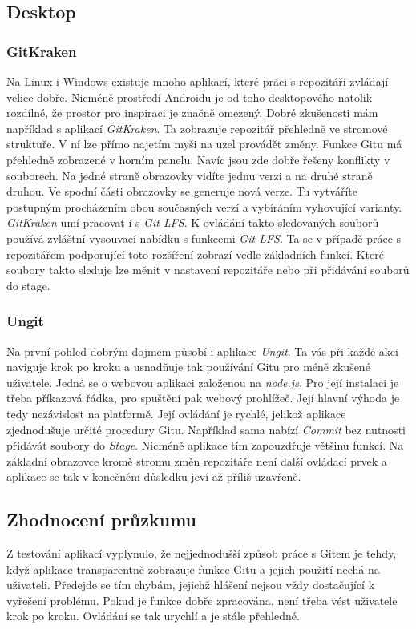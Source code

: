     \subsection {Desktop}
    \subsubsection{GitKraken}
    Na Linux i Windows existuje mnoho aplikací, které práci s repozitáři zvládají velice dobře. Nicméně prostředí Androidu je od toho desktopového natolik rozdílné, že prostor pro inspiraci je značně omezený. Dobré zkušenosti mám například s aplikací \emph{GitKraken}. Ta zobrazuje repozitář přehledně ve stromové struktuře. V ní lze přímo najetím myši na uzel provádět změny. Funkce Gitu má přehledně zobrazené v horním panelu. Navíc jsou zde dobře řešeny konflikty v souborech. Na jedné straně obrazovky vidíte jednu verzi a na druhé straně druhou. Ve spodní části obrazovky se generuje nová verze. Tu vytváříte postupným procházením obou současných verzí a vybíráním vyhovující varianty. \emph{GitKraken} umí pracovat i s \emph{Git LFS}. K ovládání takto sledovaných souborů používá zvláštní vysouvací nabídku s funkcemi \emph{Git LFS}. Ta se v případě práce s repozitářem podporující toto rozšíření zobrazí vedle základních funkcí. Které soubory takto sleduje lze měnit v nastavení repozitáře nebo při přidávání souborů do stage.

    \subsubsection{Ungit}
    Na první pohled dobrým dojmem působí i aplikace \emph{Ungit}. Ta vás při každé akci naviguje krok po kroku a usnadňuje tak používání Gitu pro méně zkušené uživatele. Jedná se o webovou aplikaci založenou na \emph{node.js}. Pro její instalaci je třeba příkazová řádka, pro spuštění pak webový prohlížeč. Její hlavní výhoda je tedy nezávislost na platformě. Její ovládání je rychlé, jelikož aplikace zjednodušuje určité procedury Gitu. Například sama nabízí \emph{Commit} bez nutnosti přidávát soubory do \emph{Stage}. Nicméně aplikace tím zapouzdřuje většinu funkcí. Na základní obrazovce kromě stromu změn repozitáře není další ovládací prvek a aplikace se tak v konečném důsledku jeví až příliš uzavřeně.

    \subsection{Zhodnocení průzkumu}
    Z testování aplikací vyplynulo, že nejjednodušší způsob práce s Gitem je tehdy, když aplikace transparentně zobrazuje funkce Gitu a jejich použití nechá na uživateli. Předejde se tím chybám, jejichž hlášení nejsou vždy dostačující k vyřešení problému. Pokud je funkce dobře zpracována, není třeba vést uživatele krok po kroku. Ovládání se tak urychlí a je stále přehledné.


